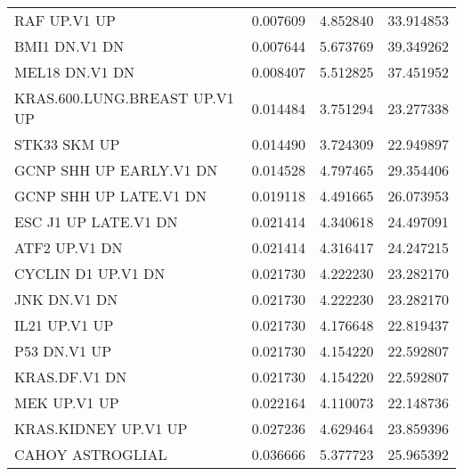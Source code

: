 \begin{tabular}{lrrr}
                      RAF UP.V1 UP &          0.007609 &  4.852840 &       33.914853 \\
                     BMI1 DN.V1 DN &          0.007644 &  5.673769 &       39.349262 \\
                    MEL18 DN.V1 DN &          0.008407 &  5.512825 &       37.451952 \\
     KRAS.600.LUNG.BREAST UP.V1 UP &          0.014484 &  3.751294 &       23.277338 \\
                      STK33 SKM UP &          0.014490 &  3.724309 &       22.949897 \\
           GCNP SHH UP EARLY.V1 DN &          0.014528 &  4.797465 &       29.354406 \\
            GCNP SHH UP LATE.V1 DN &          0.019118 &  4.491665 &       26.073953 \\
              ESC J1 UP LATE.V1 DN &          0.021414 &  4.340618 &       24.497091 \\
                     ATF2 UP.V1 DN &          0.021414 &  4.316417 &       24.247215 \\
                CYCLIN D1 UP.V1 DN &          0.021730 &  4.222230 &       23.282170 \\
                      JNK DN.V1 DN &          0.021730 &  4.222230 &       23.282170 \\
                     IL21 UP.V1 UP &          0.021730 &  4.176648 &       22.819437 \\
                      P53 DN.V1 UP &          0.021730 &  4.154220 &       22.592807 \\
                     KRAS.DF.V1 DN &          0.021730 &  4.154220 &       22.592807 \\
                      MEK UP.V1 UP &          0.022164 &  4.110073 &       22.148736 \\
              KRAS.KIDNEY UP.V1 UP &          0.027236 &  4.629464 &       23.859396 \\
                  CAHOY ASTROGLIAL &          0.036666 &  5.377723 &       25.965392 \\
\bottomrule
\end{tabular}
